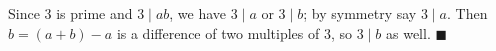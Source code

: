 Since $3$ is prime and $3\mid ab$, we have $3\mid a$ or $3\mid b$; by symmetry say $3\mid a$. Then $b=(a+b)-a$ is a difference of two multiples of $3$, so $3\mid b$ as well. $\blacksquare$
